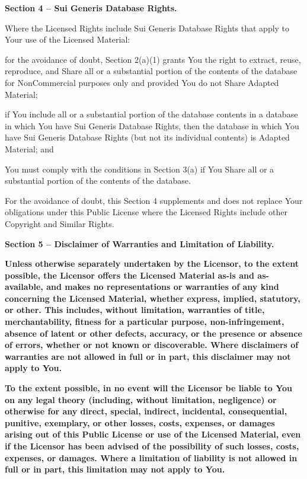\par \textbf{Section 4 – Sui Generis Database Rights.}
\par Where the Licensed Rights include Sui Generis Database Rights that apply to Your use of the Licensed Material:
\begin{doclicense@enumerate}
\item for the avoidance of doubt, Section 2(a)(1) grants You the right to extract, reuse, reproduce, and Share all or a substantial portion of the contents of the database for NonCommercial purposes only and provided You do not Share Adapted Material;
\item if You include all or a substantial portion of the database contents in a database in which You have Sui Generis Database Rights, then the database in which You have Sui Generis Database Rights (but not its individual contents) is Adapted Material; and
\item You must comply with the conditions in Section 3(a) if You Share all or a substantial portion of the contents of the database.
\end{doclicense@enumerate}
For the avoidance of doubt, this Section 4 supplements and does not replace Your obligations under this Public License where the Licensed Rights include other Copyright and Similar Rights.
\par \textbf{Section 5 – Disclaimer of Warranties and Limitation of Liability.}
\begin{doclicense@enumerate}
\item \textbf{Unless otherwise separately undertaken by the Licensor, to the extent possible, the Licensor offers the Licensed Material as-is and as-available, and makes no representations or warranties of any kind concerning the Licensed Material, whether express, implied, statutory, or other. This includes, without limitation, warranties of title, merchantability, fitness for a particular purpose, non-infringement, absence of latent or other defects, accuracy, or the presence or absence of errors, whether or not known or discoverable. Where disclaimers of warranties are not allowed in full or in part, this disclaimer may not apply to You.}
\item \textbf{To the extent possible, in no event will the Licensor be liable to You on any legal theory (including, without limitation, negligence) or otherwise for any direct, special, indirect, incidental, consequential, punitive, exemplary, or other losses, costs, expenses, or damages arising out of this Public License or use of the Licensed Material, even if the Licensor has been advised of the possibility of such losses, costs, expenses, or damages. Where a limitation of liability is not allowed in full or in part, this limitation may not apply to You.}
\end{doclicense@enumerate}

